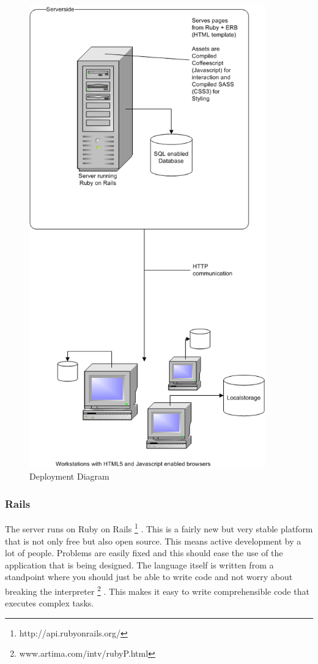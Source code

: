 \documentclass{report}
\begin{document}
				\begin{figure}[htb]
					\begin{center}
						\includegraphics[height=20cm,keepaspectratio=true]{EAD.png}
						\caption{Deployment Diagram}
						\label{fig: EAD}
					\end{center}
				\end{figure}
				\clearpage
									
				\subsubsection{Rails}
					The server runs on Ruby on Rails \footnote{http://api.rubyonrails.org/} . This is a fairly new but very stable platform that is not only free but also open source. This means active development by a lot of people. Problems are easily fixed and this should ease the use of the application that is being designed. The language itself is written from a standpoint where you should just be able to write code and not worry about breaking the interpreter \footnote{www.artima.com/intv/rubyP.html} . This makes it easy to write comprehensible code that executes complex tasks.				
\end{document}
